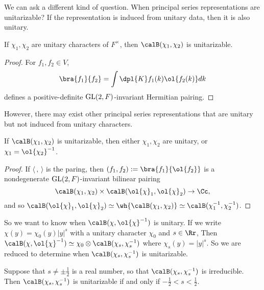 We can ask a different kind of question. When principal series representations are unitarizable? 
If the representation is induced from unitary data, then it is also unitary. 
\begin{proposition}
If $\chi_1, \chi_2$ are unitary characters of $F^{\times}$, then $\calB(\chi_1, \chi_2)$ is unitarizable. 
\end{proposition}
\begin{proof}
For $f_1, f_2\in V$,
$$
\bra{f_1}{f_2} = \int\dpl{K} f_1(k)\ol{f_2(k)} dk
$$
defines a positive-definite $\mathrm{GL}(2, F)$-invariant Hermitian pairing. 
\end{proof}
However, there may exist other principal series representations that are unitary but not induced from unitary characters.
\begin{proposition}
If $\calB(\chi_1, \chi_2)$ is unitarizable, then either $\chi_1, \chi_2$ are unitary, or $\chi_1 = \ol{\chi_2}^{-1}$. 
\end{proposition}
\begin{proof}
If $\langle \,,\,\rangle$ is the paring, then $(f_1, f_2) := \bra{f_1}{\ol{f_2}}$ is a nondegenerate $\mathrm{GL}(2, F)$-invariant bilinear pairing
$$
\calB(\chi_1, \chi_2) \times \calB(\ol{\chi}_1, \ol{\chi}_{2})\to \Cc,
$$
and so $\calB(\ol{\chi}_{1},  \ol{\chi}_2) \simeq \wh{\calB(\chi_{1}, \chi_2)} \simeq \calB(\chi_1^{-1}, \chi_2^{-1})$. 
\end{proof}
So we want to know when $\calB(\chi, \ol{\chi}^{-1})$ is unitary. 
If we write $\chi(y) = \chi_{0}(y) |y|^{s}$ with a unitary character $\chi_{0}$ and $s\in \Rr$, 
Then $\calB(\chi, \ol{\chi}^{-1})\simeq \chi_{0}\otimes \calB(\chi_s, \chi_s^{-1})$ where $\chi_s(y) = |y|^s$. 
So we are reduced to determine when $\calB(\chi_s, \chi_s^{-1})$ is unitarizable. 
\begin{proposition}
Suppose that $s\neq \pm\frac{1}{2}$ is a real number, so that $\calB(\chi_s, \chi_s^{-1})$ is irreducible. 
Then $\calB(\chi_s, \chi_s^{-1})$ is unitarizable if and only if $-\frac{1}{2} < s < \frac{1}{2}$. 
\end{proposition}
